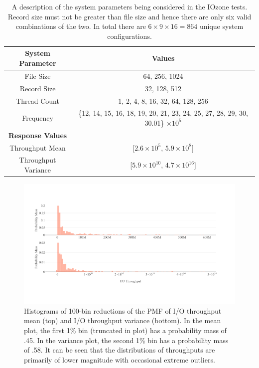 \begin{table}
  \centering
  \begin{tabular}{c|c}
    \hline
    \textbf{System Parameter} & \textbf{Values}\\
    \hline
    File Size & 64, 256, 1024\\
    Record Size & 32, 128, 512\\
    Thread Count & 1, 2, 4, 8, 16, 32, 64, 128, 256\\
    Frequency & \{12, 14, 15, 16, 18, 19, 20, 21, 23, 24, 25, 27, 28, 29, 30, 30.01\} $\times 10^5$\\
    \hline
    \textbf{Response Values} & \\
    \hline
    Throughput Mean & [$2.6 \times 10^5$, $5.9 \times 10^8$]\\
    Throughput Variance & [$5.9\times 10^{10} $, $4.7 \times 10^{16}$]\\
    \hline
  \end{tabular}
  \caption{A description of the system parameters being considered in
    the IOzone tests. Record size must not be greater than file size
    and hence there are only six valid combinations of the two. In
    total there are $6 \times 9 \times 16 = 864$ unique system
    configurations.}
  \label{tab:data_type}
\end{table}

\begin{figure}
  \centering
  \includegraphics[width=\textwidth,trim={0 .5in 0 .4in}]{Figures/HPC/Raw_Throughput.pdf}
  \caption{Histograms of 100-bin reductions of the PMF of I/O
    throughput mean (top) and I/O throughput variance (bottom). In the
    mean plot, the first 1\% bin (truncated in plot) has a probability
    mass of .45. In the variance plot, the second 1\% bin has a
    probability mass of .58. It can be seen that the distributions of
    throughputs are primarily of lower magnitude with occasional
    extreme outliers.}
  \label{fig:raw_throughput}
\end{figure}

